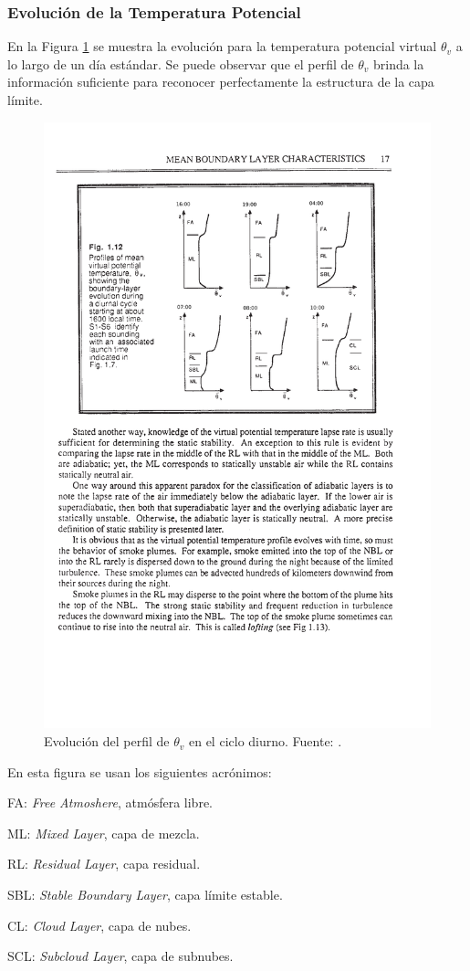 \subsubsection{Evolución de la Temperatura Potencial}
En la Figura \ref{fig:03_pbl2} se muestra la evolución para la temperatura potencial virtual $\theta_v$ a lo largo de un día estándar. Se puede observar que el perfil de $\theta_v$ brinda la información suficiente para reconocer perfectamente la estructura de la capa límite. 
\begin{figure}[h!]
	\centering
	\includegraphics[width=0.7\linewidth,trim={5.6cm 14cm 2.7cm 3.3cm},clip]{Imagenes/03/pbl2}
	\caption{Evolución del perfil de $\theta_v$ en el ciclo diurno. Fuente: \cite{stull1988introduction}.}
	\label{fig:03_pbl2}
\end{figure}

En esta figura se usan los siguientes acrónimos:
\begin{itemize*}
	\item FA: \emph{Free Atmoshere}, atmósfera libre.
	\item ML: \emph{Mixed Layer}, capa de mezcla.
	\item RL: \emph{Residual Layer}, capa residual.
	\item SBL: \emph{Stable Boundary Layer}, capa límite estable.
	\item CL: \emph{Cloud Layer}, capa de nubes.
	\item SCL: \emph{Subcloud Layer}, capa de subnubes.
\end{itemize*}
